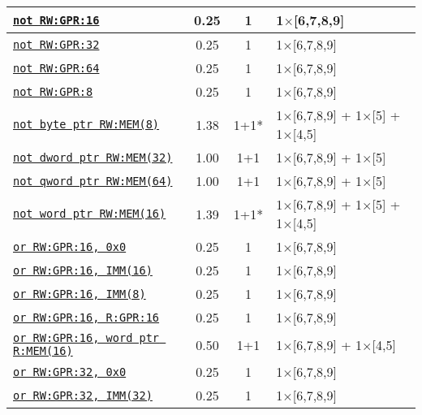\documentclass[a4paper,english,fontsize=9]{scrartcl}
\begin{document}
\begin{longtable}{p{}ccL{.25\textwidth}}
  \texttt{\href{https://felixcloutier.com/x86/NOT.html}{not RW:GPR:16}} & 0.25 & 1 & 1\(\times\)[6,7,8,9] \\
  \midrule
  \texttt{\href{https://felixcloutier.com/x86/NOT.html}{not RW:GPR:32}} & 0.25 & 1 & 1\(\times\)[6,7,8,9] \\
  \midrule
  \texttt{\href{https://felixcloutier.com/x86/NOT.html}{not RW:GPR:64}} & 0.25 & 1 & 1\(\times\)[6,7,8,9] \\
  \midrule
  \texttt{\href{https://felixcloutier.com/x86/NOT.html}{not RW:GPR:8}} & 0.25 & 1 & 1\(\times\)[6,7,8,9] \\
  \midrule
  \texttt{\href{https://felixcloutier.com/x86/NOT.html}{not byte ptr RW:MEM(8)}} & 1.38 & 1+1* & 1\(\times\)[6,7,8,9] + 1\(\times\)[5] + 1\(\times\)[4,5] \\
  \midrule
  \texttt{\href{https://felixcloutier.com/x86/NOT.html}{not dword ptr RW:MEM(32)}} & 1.00 & 1+1 & 1\(\times\)[6,7,8,9] + 1\(\times\)[5] \\
  \midrule
  \texttt{\href{https://felixcloutier.com/x86/NOT.html}{not qword ptr RW:MEM(64)}} & 1.00 & 1+1 & 1\(\times\)[6,7,8,9] + 1\(\times\)[5] \\
  \midrule
  \texttt{\href{https://felixcloutier.com/x86/NOT.html}{not word ptr RW:MEM(16)}} & 1.39 & 1+1* & 1\(\times\)[6,7,8,9] + 1\(\times\)[5] + 1\(\times\)[4,5] \\
  \midrule
  \texttt{\href{https://felixcloutier.com/x86/OR.html}{or RW:GPR:16, 0x0}} & 0.25 & 1 & 1\(\times\)[6,7,8,9] \\
  \midrule
  \texttt{\href{https://felixcloutier.com/x86/OR.html}{or RW:GPR:16, IMM(16)}} & 0.25 & 1 & 1\(\times\)[6,7,8,9] \\
  \midrule
  \texttt{\href{https://felixcloutier.com/x86/OR.html}{or RW:GPR:16, IMM(8)}} & 0.25 & 1 & 1\(\times\)[6,7,8,9] \\
  \midrule
  \texttt{\href{https://felixcloutier.com/x86/OR.html}{or RW:GPR:16, R:GPR:16}} & 0.25 & 1 & 1\(\times\)[6,7,8,9] \\
  \midrule
  \texttt{\href{https://felixcloutier.com/x86/OR.html}{or RW:GPR:16, word ptr R:MEM(16)}} & 0.50 & 1+1 & 1\(\times\)[6,7,8,9] + 1\(\times\)[4,5] \\
  \midrule
  \texttt{\href{https://felixcloutier.com/x86/OR.html}{or RW:GPR:32, 0x0}} & 0.25 & 1 & 1\(\times\)[6,7,8,9] \\
  \midrule
  \texttt{\href{https://felixcloutier.com/x86/OR.html}{or RW:GPR:32, IMM(32)}} & 0.25 & 1 & 1\(\times\)[6,7,8,9] \\

\end{longtable}
\end{document}
